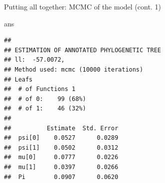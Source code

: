 \documentclass[9pt,handout,ignorenonframetext,]{beamer}
\newenvironment{Shaded}{\begin{snugshade}}{\end{snugshade}}
\newcommand{\NormalTok}[1]{\textcolor[rgb]{0.80,0.80,0.80}{#1}}
\begin{document}
\begin{frame}[fragile,t]{Putting all together: MCMC of the model (cont.
1)}

\footnotesize

\begin{Shaded}
\begin{Highlighting}[]
\NormalTok{ans}
\end{Highlighting}
\end{Shaded}

\begin{verbatim}
## 
## ESTIMATION OF ANNOTATED PHYLOGENETIC TREE
## ll:  -57.0072,
## Method used: mcmc (10000 iterations)
## Leafs
##  # of Functions 1
##  # of 0:    99 (68%)
##  # of 1:    46 (32%)
## 
##          Estimate  Std. Error
##  psi[0]    0.0527      0.0289
##  psi[1]    0.0502      0.0312
##  mu[0]     0.0777      0.0226
##  mu[1]     0.0397      0.0266
##  Pi        0.0907      0.0620
\end{verbatim}

\normalsize

\end{frame}
\end{document}

